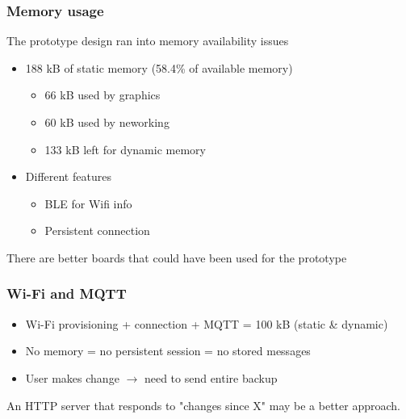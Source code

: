 \documentclass{beamer}
\begin{document}
\begin{frame}
  \frametitle{Memory usage}

  The prototype design ran into memory availability issues
  \begin{itemize}
    \item 188 kB of static memory (58.4\% of available memory)
    \begin{itemize}
      \item 66 kB used by graphics
      \item 60 kB used by neworking
      \item 133 kB left for dynamic memory
    \end{itemize}
    \item Different features
    \begin{itemize}
      \item BLE for Wifi info
      \item Persistent connection
    \end{itemize}
  \end{itemize}
  There are better boards that could have been used for the prototype


\end{frame}

\begin{frame}
  \frametitle{Wi-Fi and MQTT}

  \begin{itemize}
    \item Wi-Fi provisioning + connection + MQTT = 100 kB (static \& dynamic)
    \item No memory = no persistent session = no stored messages
    \item User makes change $\rightarrow$ need to send entire backup
  \end{itemize}

  An HTTP server that responds to "changes since X" may be a better approach.

\end{frame}
\end{document}
